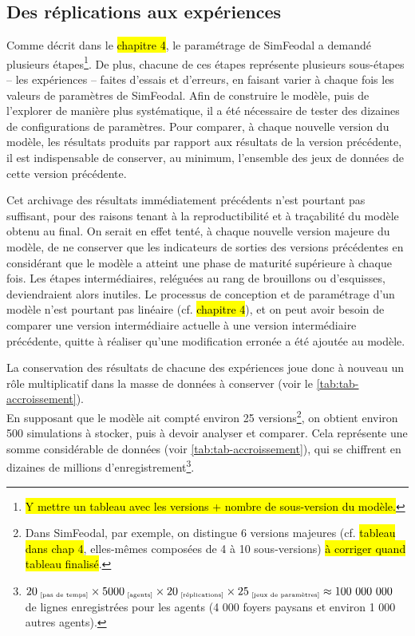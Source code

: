 \subsection{Des réplications aux expériences}\label{subsec:capter-experiences}

Comme décrit dans le \hl{chapitre 4}, le paramétrage de SimFeodal a demandé plusieurs étapes\footnote{
	\hl{Y mettre un tableau avec les versions + nombre de sous-version du modèle.}
}.
De plus, chacune de ces étapes représente plusieurs sous-étapes -- les expériences -- faites d'essais et d'erreurs, en faisant varier à chaque fois les valeurs de paramètres de SimFeodal.
Afin de construire le modèle, puis de l'explorer de manière plus systématique, il a été nécessaire de tester des dizaines de configurations de paramètres.
Pour comparer, à chaque nouvelle version du modèle, les résultats produits par rapport aux résultats de la version précédente, il est indispensable de conserver, au minimum, l'ensemble des jeux de données de cette version précédente.

Cet archivage des résultats immédiatement précédents n'est pourtant pas suffisant, pour des raisons tenant à la reproductibilité et à traçabilité du modèle obtenu au final.
On serait en effet tenté, à chaque nouvelle version \og majeure\fg{} du modèle, de ne conserver que les indicateurs de sorties des versions précédentes en considérant que le modèle a atteint une phase de maturité supérieure à chaque fois.
Les étapes intermédiaires, reléguées au rang de brouillons ou d'esquisses, deviendraient alors inutiles.
Le processus de conception et de paramétrage d'un modèle n'est pourtant pas linéaire (cf. \hl{chapitre 4}), et on peut avoir besoin de comparer une version intermédiaire \og actuelle\fg{} à une version intermédiaire précédente, quitte à réaliser qu'une modification erronée a été ajoutée au modèle.

La conservation des résultats de chacune des expériences joue donc à nouveau un rôle multiplicatif dans la masse de données à conserver (voir le \cref{tab:tab-accroissement}).\\
En supposant que le modèle ait compté environ 25 versions\footnote{
	Dans SimFeodal, par exemple, on distingue 6 versions \og majeures\fg{} (cf. \hl{tableau dans chap 4}, elles-mêmes composées de 4 à 10 sous-versions) \hl{à corriger quand tableau finalisé}.
}, on obtient environ 500 simulations à stocker, puis à devoir analyser et comparer.
Cela représente une somme considérable de données (voir \cref{tab:tab-accroissement}), qui se chiffrent en dizaines de millions d'enregistrement\footnote{
	$20_{\text{\tiny ~[pas de temps]}} \times 5000_{\text{\tiny ~[agents]}} \times 20_{\text{\tiny ~[réplications]}} \times 25_{\text{\tiny ~[jeux de paramètres]}} \approx 100~000~000$ de lignes enregistrées pour les agents (4 000 foyers paysans et environ 1 000 autres agents).
}.

